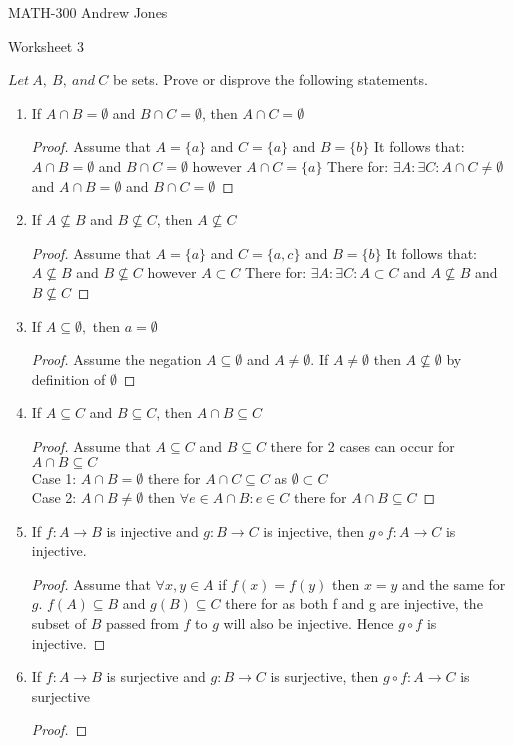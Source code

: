 \documentclass{article}
\begin{document}
  MATH-300 \hfill Andrew Jones
  \begin{center}
  {\huge Worksheet 3}
  \end{center}
  $Let\ A,\ B,\ and\ C$ be sets. Prove or disprove the following statements. \\
  \begin{enumerate}
  \item If $A\cap B = \emptyset$ and $B\cap C = \emptyset$, then $A\cap C = \emptyset$
    \begin{proof}
      Assume that $A = \{a\}$ and $C = \{a\}$ and $B = \{b\}$ 
      It follows that: $A\cap B = \emptyset$ and $B\cap C = \emptyset$ however $A\cap C = \{a\}$
      There for: $\exists A: \exists C: A\cap C \neq \emptyset$ and $A\cap B = \emptyset$ and $B\cap C = \emptyset$  
    \end{proof}
  \item If $A\not\subseteq B$ and $B\not\subseteq C$, then $A\not\subseteq C$ 
    \begin{proof}
      Assume that $A = \{a\}$ and $C = \{a, c\}$ and $B = \{b\}$ 
      It follows that: $A\not\subseteq B$ and $B\not\subseteq C$ however $A\subset C$
      There for: $\exists A: \exists C: A\subset C$ and $A\not\subseteq B$ and $B\not\subseteq C$  
    \end{proof}
  \item If $A\subseteq \emptyset,$ then $a= \emptyset$ 
    \begin{proof}
      Assume the negation $A\subseteq \emptyset$ and $A \neq \emptyset$.
      If $A \neq \emptyset$ then $A\not\subseteq \emptyset$ by definition of $\emptyset$ 
    \end{proof}
  \item If $A\subseteq C$ and $B\subseteq C$, then $A\cap B\subseteq C$
    \begin{proof}
     Assume that $A\subseteq C$ and $B\subseteq C$ there for 2 cases can occur for $A\cap B\subseteq C$ \\
     Case 1: $A\cap B = \emptyset$ there for $A\cap C\subseteq C$ as $\emptyset \subset C$ \\
     Case 2: $A\cap B \neq \emptyset$ then $\forall e\in A\cap B: e\in C$ there for $A\cap B \subseteq C$
    \end{proof}
  \item If $f : A\to B$ is injective and $g : B\to C$ is injective, then $g \circ f : A\to C$ is injective. 
    \begin{proof}
      Assume that $\forall x,y\in A$ if $f(x) = f(y)$ then $x = y$ and the same for $g$. $f(A) \subseteq B$ and $g(B) \subseteq C$ there for as both f and g are injective, the subset of $B$ passed from $f$ to $g$ will also be injective. Hence $g \circ f$ is injective.
    \end{proof}
  \item If $f : A\to B$ is surjective and $g : B\to C$ is surjective, then $g \circ f : A\to C$ is surjective 
    \begin{proof}
         

\end{proof}
\end{enumerate}
\end{document}
